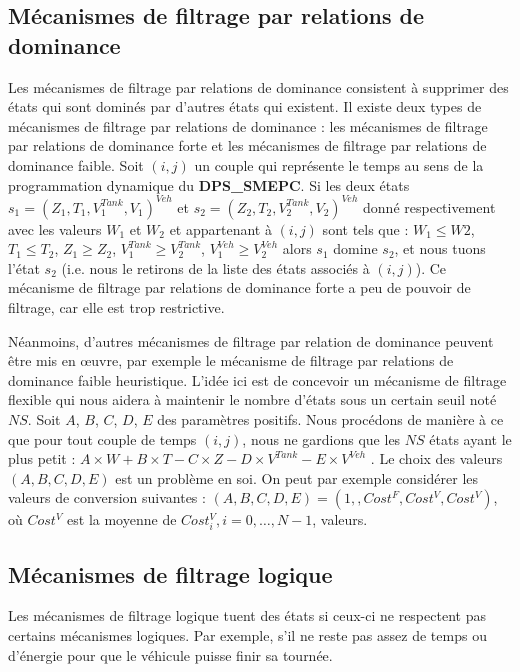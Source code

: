 \subsection{Mécanismes de filtrage par relations de dominance }
Les mécanismes de filtrage par relations de dominance consistent à supprimer des états qui sont dominés par d'autres états qui existent. Il existe deux types de mécanismes de filtrage par relations de dominance : les mécanismes de filtrage par relations de dominance forte et les mécanismes de filtrage par relations de dominance faible. Soit $(i,j)$ un couple qui représente le temps au sens de la programmation dynamique du \textbf{DPS\_SMEPC}. Si les deux états $s_1=(Z_1,T_1,V_1^{Tank},V_1)^{Veh}$ et $s_2=(Z_2,T_2,V_2^{Tank},V_2)^{Veh}$ donné respectivement avec les valeurs $W_1$ et $W_2$ et appartenant à $(i,j)$ sont tels que : $W_1\leq W2$, $T_1\leq T_2$, $Z_1\geq Z_2$, $V^{Tank}_1\geq V^{Tank}_2$, $V^{Veh}_1\geq V^{Veh}_2$ alors $s_1$ domine $s_2$, et nous tuons l'état $s_2$ (i.e. nous le retirons de la liste des états associés à $(i, j)$). Ce mécanisme de filtrage par relations de dominance forte a peu de pouvoir de filtrage, car elle est trop restrictive. 

Néanmoins, d'autres mécanismes de filtrage par relation de dominance peuvent être mis en œuvre, par exemple le mécanisme de filtrage par relations de dominance faible heuristique. L'idée ici est de concevoir un mécanisme de filtrage flexible qui nous aidera à maintenir le nombre d'états sous un certain seuil noté $NS$. Soit $A$, $B$, $C$, $D$, $E$ des paramètres positifs. Nous procédons de manière à ce que pour tout couple de temps $(i, j)$, nous ne gardions que les $NS$ états ayant le plus petit : $A\times W + B\times T - C\times Z - D\times V^{Tank} - E\times V^{Veh}$ . Le choix des valeurs $ (A, B, C, D, E)$ est un problème en soi. On peut par exemple considérer les valeurs de conversion suivantes : 
$(A, B, C, D, E) = (1, , Cost^F, Cost^V, Cost^V)$, où $Cost^V$ est la moyenne de $Cost^V_i, i= 0, \dots, N-1$, valeurs.



\subsection{Mécanismes de filtrage logique} 
\label{Logique_SMEPC_ALGO}
Les mécanismes de filtrage logique tuent des états si ceux-ci ne respectent pas certains mécanismes logiques. Par exemple, s'il ne reste pas assez de temps ou d'énergie pour que le véhicule puisse finir sa tournée.

